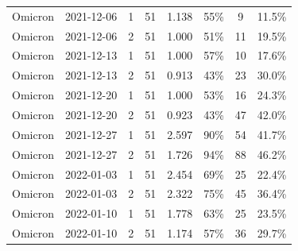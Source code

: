 \begin{tabular}{llcccccc}
Omicron & 2021-12-06 & 1 & 51 & 1.138 & 55\% & 9 & 11.5\% \\
Omicron & 2021-12-06 & 2 & 51 & 1.000 & 51\% & 11 & 19.5\% \\
Omicron & 2021-12-13 & 1 & 51 & 1.000 & 57\% & 10 & 17.6\% \\
Omicron & 2021-12-13 & 2 & 51 & 0.913 & 43\% & 23 & 30.0\% \\
Omicron & 2021-12-20 & 1 & 51 & 1.000 & 53\% & 16 & 24.3\% \\
Omicron & 2021-12-20 & 2 & 51 & 0.923 & 43\% & 47 & 42.0\% \\
Omicron & 2021-12-27 & 1 & 51 & 2.597 & 90\% & 54 & 41.7\% \\
Omicron & 2021-12-27 & 2 & 51 & 1.726 & 94\% & 88 & 46.2\% \\
Omicron & 2022-01-03 & 1 & 51 & 2.454 & 69\% & 25 & 22.4\% \\
Omicron & 2022-01-03 & 2 & 51 & 2.322 & 75\% & 45 & 36.4\% \\
Omicron & 2022-01-10 & 1 & 51 & 1.778 & 63\% & 25 & 23.5\% \\
Omicron & 2022-01-10 & 2 & 51 & 1.174 & 57\% & 36 & 29.7\% \\
\bottomrule
\end{tabular}
